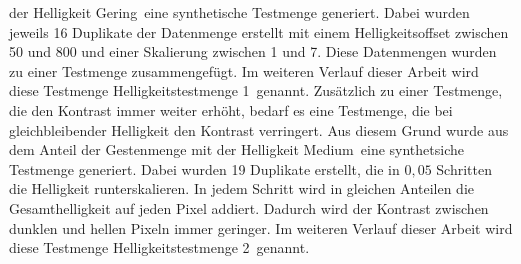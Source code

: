 der Helligkeit \glqq Gering\grqq\ eine synthetische Testmenge generiert. Dabei wurden jeweils 16 Duplikate der Datenmenge erstellt mit einem Helligkeitsoffset zwischen 50 und 800 und einer
Skalierung zwischen 1 und 7. Diese Datenmengen wurden zu einer Testmenge zusammengefügt. Im weiteren Verlauf dieser Arbeit wird diese Testmenge \glqq Helligkeitstestmenge 1\grqq\ genannt.
\newline
\newline
Zusätzlich zu einer Testmenge, die den Kontrast immer weiter erhöht, bedarf es eine Testmenge, die bei gleichbleibender Helligkeit den Kontrast verringert. Aus diesem Grund wurde aus dem Anteil der Gestenmenge mit
der Helligkeit \glqq Medium\grqq\ eine synthetsiche Testmenge generiert. Dabei wurden 19 Duplikate erstellt, die in $0,05$ Schritten die Helligkeit runterskalieren. In jedem Schritt wird in gleichen
Anteilen die Gesamthelligkeit auf jeden Pixel addiert. Dadurch wird der Kontrast zwischen dunklen und hellen Pixeln immer geringer. Im weiteren Verlauf dieser Arbeit wird diese Testmenge
\glqq Helligkeitstestmenge 2\grqq\ genannt.